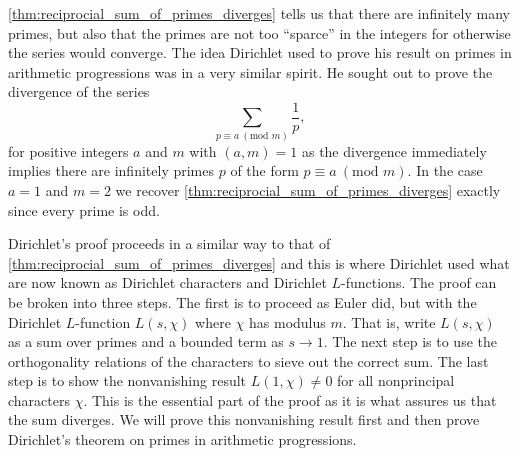 \documentclass[12pt]{book}
\theoremstyle{definition}\newframedtheorem{method}{Method}
\newcommand{\tmod}[1]{\ \left(\text{mod }#1\right)}
\newcommand{\<}{\langle}
\renewcommand{\>}{\rangle}
\begin{document}
      \cref{thm:reciprocial_sum_of_primes_diverges} tells us that there are infinitely many primes, but also that the primes are not too ``sparce'' in the integers for otherwise the series would converge. The idea Dirichlet used to prove his result on primes in arithmetic progressions was in a very similar spirit. He sought out to prove the divergence of the series
      \[
        \sum_{p \equiv a \tmod{m}}\frac{1}{p},
      \]
      for positive integers $a$ and $m$ with $(a,m) = 1$ as the divergence immediately implies there are infinitely primes $p$ of the form $p \equiv a \tmod{m}$. In the case $a = 1$ and $m = 2$ we recover \cref{thm:reciprocial_sum_of_primes_diverges} exactly since every prime is odd.

      Dirichlet's proof proceeds in a similar way to that of \cref{thm:reciprocial_sum_of_primes_diverges} and this is where Dirichlet used what are now known as Dirichlet characters and Dirichlet $L$-functions. The proof can be broken into three steps. The first is to proceed as Euler did, but with the Dirichlet $L$-function $L(s,\chi)$ where $\chi$ has modulus $m$. That is, write $L(s,\chi)$ as a sum over primes and a bounded term as $s \to 1$. The next step is to use the orthogonality relations of the characters to sieve out the correct sum. The last step is to show the nonvanishing result $L(1,\chi) \neq 0$ for all nonprincipal characters $\chi$. This is the essential part of the proof as it is what assures us that the sum diverges. We will prove this nonvanishing result first and then prove Dirichlet's theorem on primes in arithmetic progressions.
\end{document}
